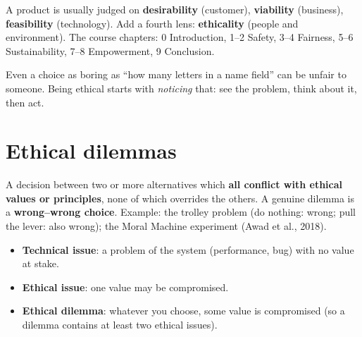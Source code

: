 \documentclass[11pt,a4paper,openany]{book}
\begin{document}
\begin{propbox}[title={Ethical lenses (IDEO, 2015; Isaac, 2023)}]
A product is usually judged on \textbf{desirability} (customer), \textbf{viability} (business),
\textbf{feasibility} (technology). Add a fourth lens: \textbf{ethicality} (people and
environment). The course chapters: 0 Introduction, 1--2 Safety, 3--4 Fairness, 5--6
Sustainability, 7--8 Empowerment, 9 Conclusion.
\end{propbox}

\begin{goatbox}
Even a choice as boring as ``how many letters in a name field'' can be unfair to someone. Being
ethical starts with \emph{noticing} that: see the problem, think about it, then act.
\end{goatbox}


\section{Ethical dilemmas}

\begin{defnbox}[title={Ethical dilemma (Swisher, 2005; van de Poel \& Royakkers, 2011)}]
A decision between two or more alternatives which \textbf{all conflict with ethical values or
principles}, none of which overrides the others. A genuine dilemma is a
\textbf{wrong--wrong choice}. Example: the trolley problem (do nothing: wrong; pull the lever:
also wrong); the Moral Machine experiment (Awad et al., 2018).
\end{defnbox}

\begin{warnbox}[title={Technical issue, ethical issue or dilemma?}]
\begin{itemize}
  \item \textbf{Technical issue}: a problem of the system (performance, bug) with no value at
        stake.
  \item \textbf{Ethical issue}: one value may be compromised.
  \item \textbf{Ethical dilemma}: whatever you choose, some value is compromised (so a
        dilemma contains at least two ethical issues).
\end{itemize}
\end{warnbox}
\end{document}
